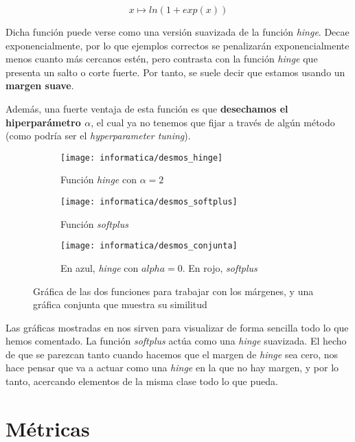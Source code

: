 \begin{equation}
    x \mapsto ln(1 + exp(x))
\end{equation}

Dicha función puede verse como una versión suavizada de la función \textit{hinge}. Decae exponencialmente, por lo que ejemplos correctos se penalizarán exponencialmente menos cuanto más cercanos estén, pero contrasta con la función \textit{hinge} que presenta un salto o corte fuerte. Por tanto, se suele decir que estamos usando un \textbf{margen suave}.

Además, una fuerte ventaja de esta función es que \textbf{desechamos el hiperparámetro $\alpha$}, el cual ya no tenemos que fijar a través de algún método (como podría ser el \textit{hyperparameter tuning}).

\begin{figure}[H]
\centering
    \begin{subfigure}{.5\textwidth}
        \centering
        \texttt{[image: informatica/desmos\_hinge]}
        \caption{Función \textit{hinge} con $\alpha = 2$}
    \end{subfigure}%
    \begin{subfigure}{.5\textwidth}
        \centering
        \texttt{[image: informatica/desmos\_softplus]}
        \caption{Función \textit{softplus}}
    \end{subfigure}

    \begin{subfigure}{.5\textwidth}
        \centering
        \texttt{[image: informatica/desmos\_conjunta]}
        \caption{En azul, \textit{hinge} con $alpha = 0$. En rojo, \textit{softplus}}
    \end{subfigure}


\caption{Gráfica de las dos funciones para trabajar con los márgenes, y una gráfica conjunta que muestra su similitud}
    \label{img:graficas_margenes}
\end{figure}

Las gráficas mostradas en  nos sirven para visualizar de forma sencilla todo lo que hemos comentado. La función \textit{softplus} actúa como una \textit{hinge} suavizada. El hecho de que se parezcan tanto cuando hacemos que el margen de \textit{hinge} sea cero, nos hace pensar que va a actuar como una \textit{hinge} en la que no hay margen, y por lo tanto, acercando elementos de la misma clase todo lo que pueda.

\section{Métricas}


